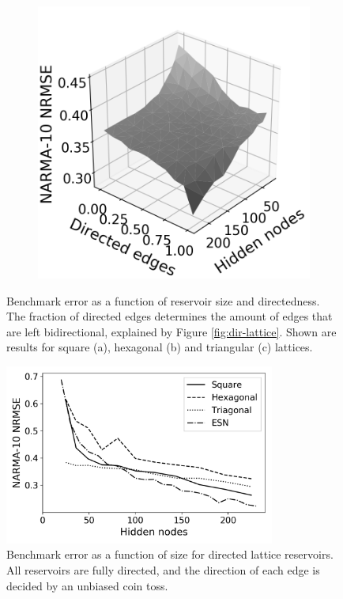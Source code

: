 \begin{figure}[htb]
\begin{subfigure}{.32\textwidth}
    \caption{}
    \label{fig:rt-dir-perf-trisurf-hex}
  \end{subfigure}
  \begin{subfigure}{.32\textwidth}
    \centering
    \includegraphics[width=1.0\linewidth]{figures/rt-dir-perf-tri.png}
    \caption{}
    \label{fig:rt-dir-perf-trisurf-tri}
  \end{subfigure}
  \caption{
    Benchmark error as a function of reservoir size and directedness. The
fraction of directed edges determines the amount of edges that are left
bidirectional, explained by Figure \protect\ref{fig:dir-lattice}. Shown are
results for square (a), hexagonal (b) and triangular (c) lattices.
  }
  \label{fig:rt-dir-perf-trisurf}
\end{figure}

\begin{figure}[htb]
  \centering
  \includegraphics[width=3.5in]{figures/rt-dir-perf.png}
  \caption{
    Benchmark error as a function of size for directed lattice reservoirs. All
reservoirs are fully directed, and the direction of each edge is decided by an
unbiased coin toss.
  }
  \label{fig:rt-dir-perf}
\end{figure}

